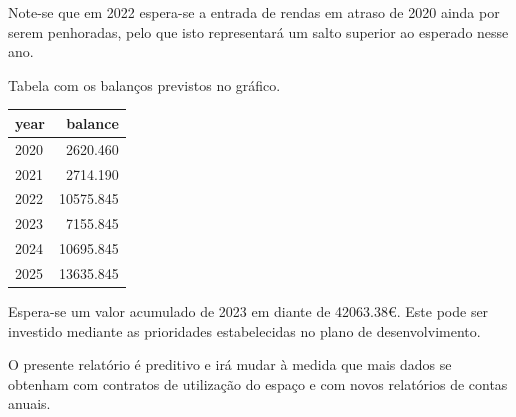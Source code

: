 \documentclass[
]{article}
\begin{document}
Note-se que em 2022 espera-se a entrada de rendas em atraso de 2020
ainda por serem penhoradas, pelo que isto representará um salto superior
ao esperado nesse ano.

Tabela com os balanços previstos no gráfico.

\begin{longtable}[]{@{}lr@{}}
\toprule
year & balance \\
\midrule
\endhead
2020 & 2620.460 \\
2021 & 2714.190 \\
2022 & 10575.845 \\
2023 & 7155.845 \\
2024 & 10695.845 \\
2025 & 13635.845 \\
\bottomrule
\end{longtable}

Espera-se um valor acumulado de 2023 em diante de 42063.38€. Este pode
ser investido mediante as prioridades estabelecidas no plano de
desenvolvimento.

O presente relatório é preditivo e irá mudar à medida que mais dados se
obtenham com contratos de utilização do espaço e com novos relatórios de
contas anuais.
\end{document}
